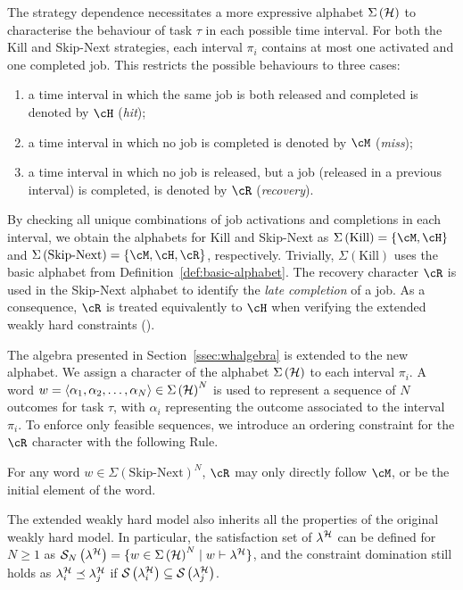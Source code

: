 The strategy dependence necessitates a more expressive alphabet $\Sigma\left( \mathcal{H} \right)$ to characterise the behaviour of task $\tau$ in each possible time interval.
For both the Kill and Skip-Next strategies, each interval $\pi_i$ contains at most one activated and one completed job.
This restricts the possible behaviours to three cases:
%
\begin{enumerate}[label=(\roman*)]
    \item a time interval in which the same job is both released and completed is denoted by $\cH$ (\emph{hit});
    \item a time interval in which no job is completed is denoted by $\cM$ (\emph{miss});
    \item a time interval in which no job is released, but a job (released in a previous interval) is completed, is denoted by $\cR$ (\emph{recovery}).
\end{enumerate}
%
By checking all unique combinations of job activations and completions in each interval, we obtain the alphabets for Kill and Skip-Next as $\Sigma\left(\text{Kill}\right) = \{ \cM, \cH \}$ and $\Sigma\left(\text{Skip-Next}\right) = \{ \cM, \cH, \cR \}$, respectively.
Trivially, $\Sigma\left(\text{Kill}\right)$ uses the basic alphabet from Definition~\ref{def:basic-alphabet}.
The recovery character $\cR$ is used in the Skip-Next alphabet to identify the \emph{late completion} of a job.
As a consequence, $\cR$ is treated equivalently to $\cH$ when verifying the extended weakly hard constraints (\ewhc{}).

The algebra presented in Section~\ref{ssec:whalgebra} is extended to the new alphabet.
We assign a character of the alphabet $\Sigma\left(\mathcal{H}\right)$ to each interval $\pi_i$.
A word $w = \langle \alpha_1,\alpha_2,\dots,\alpha_N \rangle \in \Sigma\left(\mathcal{H}\right)^N$ is used to represent a sequence of $N$ outcomes for task $\tau$, with $\alpha_i$ representing the outcome associated to the interval $\pi_i$. 
To enforce only feasible sequences, we introduce an ordering constraint for the $\cR$ character with the following Rule.
%
\begin{rule_}%
    \label{rule:R}%
    For any word $w \in \Sigma\left(\text{Skip-Next}\right)^N$, $\cR$ may only directly follow $\cM$, or be the initial element of the word.
\end{rule_}

The extended weakly hard model also inherits all the properties of the original weakly hard model.
In particular, the satisfaction set of $\lambda^{\mathcal{H}}$ can be defined for $N\geq 1$ as $\mathcal{S}_{N}\left( \lambda^{\mathcal{H}} \right) = \{ w \in \Sigma\left(\mathcal{H}\right)^N \mid w \vdash \lambda^{\mathcal{H}} \}$, and the constraint domination still holds as $\lambda^{\mathcal{H}}_{i} \preceq \lambda^{\mathcal{H}}_{j}$ if $\mathcal{S}_{}\left( \lambda^{\mathcal{H}}_{i}  \right) \subseteq \mathcal{S}_{}\left( \lambda^{\mathcal{H}}_{j} \right)$.
